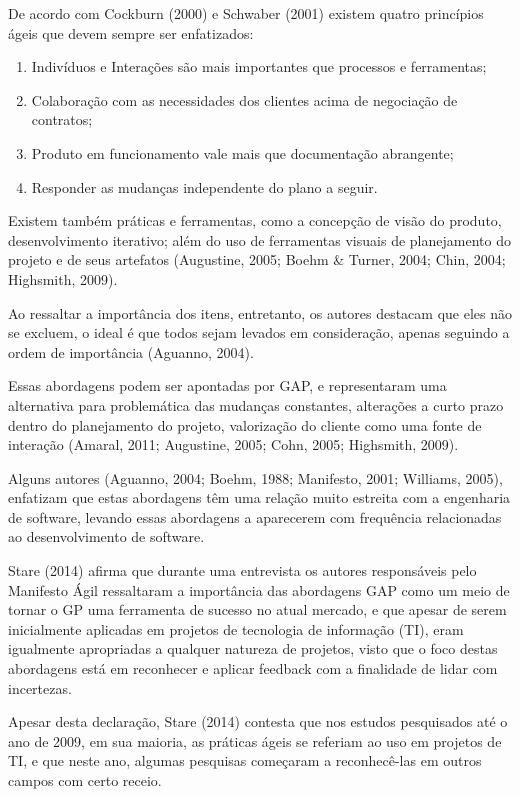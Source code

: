 De acordo com Cockburn (2000) e Schwaber (2001) existem quatro princípios ágeis que devem sempre ser enfatizados:

\begin{enumerate}
    \item{Indivíduos e Interações são mais importantes que processos e ferramentas;}
    \item{Colaboração com as necessidades dos clientes acima de negociação de contratos;}
    \item{Produto em funcionamento vale mais que documentação abrangente;}
    \item{Responder as mudanças independente do plano a seguir.}
\end{enumerate}

Existem também práticas e ferramentas, como a concepção de visão do produto, desenvolvimento iterativo; além do uso de ferramentas visuais de planejamento do projeto e de seus artefatos (Augustine, 2005; Boehm \& Turner, 2004; Chin, 2004; Highsmith, 2009).

Ao ressaltar a importância dos itens, entretanto, os autores destacam que eles não se excluem, o ideal é que todos sejam levados em consideração, apenas seguindo a ordem de importância (Aguanno, 2004).

Essas abordagens podem ser apontadas por GAP, e representaram uma alternativa para problemática das mudanças constantes, alterações a curto prazo dentro do planejamento do projeto, valorização do cliente como uma fonte de interação (Amaral, 2011; Augustine, 2005; Cohn, 2005; Highsmith, 2009).

Alguns autores (Aguanno, 2004; Boehm, 1988; Manifesto, 2001; Williams, 2005), enfatizam que estas abordagens têm uma relação muito estreita com a engenharia de software, levando essas abordagens a aparecerem com frequência relacionadas ao desenvolvimento de software.

Stare (2014) afirma que durante uma entrevista os autores responsáveis pelo Manifesto Ágil ressaltaram a importância das abordagens GAP como um meio de tornar o GP uma ferramenta de sucesso no atual mercado, e que apesar de serem inicialmente aplicadas em projetos de tecnologia de informação (TI), eram igualmente apropriadas a qualquer natureza de projetos, visto que o foco destas abordagens está em reconhecer e aplicar feedback com a finalidade de lidar com incertezas.

Apesar desta declaração, Stare (2014) contesta que nos estudos pesquisados até o ano de 2009, em sua maioria, as práticas ágeis se referiam ao uso em projetos de TI, e que neste ano, algumas pesquisas começaram a reconhecê-las em outros campos com certo receio.

